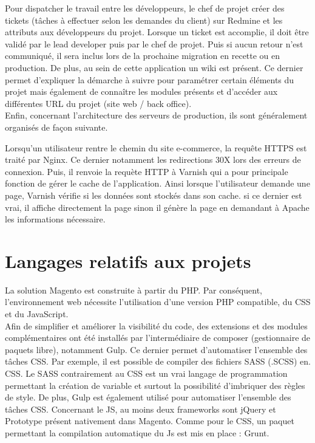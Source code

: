 \documentclass[12pt, a4paper, twoside]{report}
\begin{document}
Pour dispatcher le travail entre les développeurs, le chef de projet créer des tickets (tâches à effectuer selon les demandes du client) sur Redmine et les attributs aux développeurs du projet. Lorsque un ticket est accomplie, il doit être validé par le lead developer puis par le chef de projet. Puis si aucun retour n'est communiqué, il sera inclus lors de la prochaine migration en recette ou en production. De plus, au sein de cette application un wiki est présent. Ce dernier permet d'expliquer la démarche à suivre pour paramétrer certain éléments du projet mais également de connaître les modules présents et d'accéder aux différentes URL du projet (site web / back office). \\

Enfin, concernant l'architecture des serveurs de production, ils sont généralement organisés de façon suivante.

	 \par
	
Lorsqu'un utilisateur rentre le chemin du site e-commerce, la requête HTTPS est traité par Nginx. Ce dernier notamment les redirections 30X lors des erreurs de connexion. Puis, il renvoie la requète HTTP à Varnish qui a pour principale fonction de gérer le cache de l'application. Ainsi lorsque l'utilisateur demande une page, Varnish vérifie si les données sont stockés dans son cache. si ce dernier est vrai, il affiche directement la page sinon il génère la page en demandant à Apache les informations nécessaire.   
	

\section{Langages relatifs aux projets}

La solution Magento est construite à partir du PHP. Par conséquent, l'environnement web nécessite l'utilisation d'une version PHP compatible, du CSS et du JavaScript. \\

Afin de simplifier et améliorer la visibilité du code, des extensions et des modules complémentaires ont été installés par l'intermédiaire de composer (gestionnaire de paquets libre), notamment Gulp. Ce dernier permet d'automatiser l'ensemble des tâches CSS. Par exemple, il est possible de compiler des fichiers  SASS (.SCSS) en. CSS. Le SASS contrairement au CSS est un vrai langage de programmation permettant la création de variable et surtout la possibilité d’imbriquer des règles de style. De plus, Gulp est également utilisé pour automatiser l'ensemble des tâches CSS. Concernant le JS, au moins deux frameworks sont jQuery et Prototype présent nativement dans Magento. Comme pour le CSS, un paquet permettant la compilation automatique du Js est mis en place : Grunt.
\end{document}
